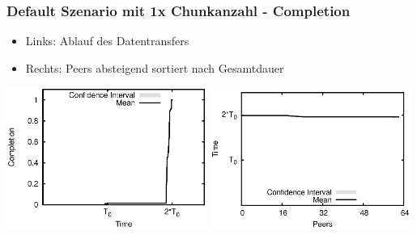\begin{frame}
  \frametitle{Default Szenario mit 1x Chunkanzahl - Completion}
  \begin{itemize}  
    \item Links: Ablauf des Datentransfers
    \item Rechts: Peers absteigend sortiert nach Gesamtdauer
  \end{itemize}

  \begin{center}
    \includegraphics[width=0.49\textwidth]{fig/plots/scenario_7_chunk_count_fac_1/plots/GeneratedMeanChunkCompletion.csv.eps}
    \hfill
    \includegraphics[width=0.49\textwidth]{fig/plots/scenario_7_chunk_count_fac_1/plots/GeneratedMeanSortedChunkCompletion.csv.eps}
  \end{center}
\end{frame}


